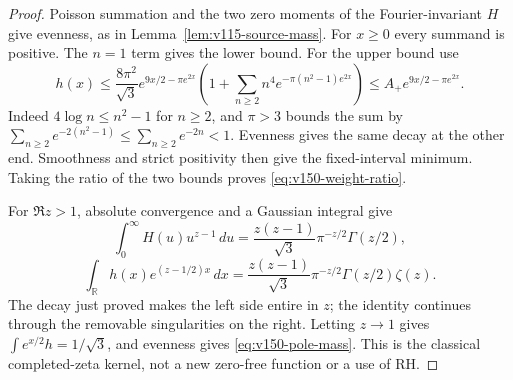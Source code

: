 \documentclass[11pt]{article}
\theoremstyle{remark}
\begin{document}
\begin{proof}
Poisson summation and the two zero moments of the Fourier-invariant
$H$ give evenness, as in Lemma~\ref{lem:v115-source-mass}.
For $x\ge0$ every summand is positive. The $n=1$ term gives the lower
bound. For the upper bound use
\[
 h(x)\le\frac{8\pi^2}{\sqrt3}e^{9x/2-\pi e^{2x}}
 \left(1+\sum_{n\ge2}n^4e^{-\pi(n^2-1)e^{2x}}\right)
 \le A_+e^{9x/2-\pi e^{2x}}.
\]
Indeed $4\log n\le n^2-1$ for $n\ge2$, and $\pi>3$ bounds the sum
by $\sum_{n\ge2}e^{-2(n^2-1)}\le\sum_{n\ge2}e^{-2n}<1$.
Evenness gives the same decay at the other end. Smoothness and strict
positivity then give the fixed-interval minimum. Taking the ratio of
the two bounds proves \eqref{eq:v150-weight-ratio}.

For $\Re z>1$, absolute convergence and a Gaussian integral give
\[
 \int_0^\infty H(u)u^{z-1}\,du
 =\frac{z(z-1)}{\sqrt3}\pi^{-z/2}\Gamma(z/2),
\]
\begin{equation}\label{eq:v150-mellin}
 \int_{\mathbb R}h(x)e^{(z-1/2)x}\,dx
 =\frac{z(z-1)}{\sqrt3}\pi^{-z/2}\Gamma(z/2)\zeta(z).
\end{equation}
The decay just proved makes the left side entire in $z$; the identity
continues through the removable singularities on the right. Letting
$z\to1$ gives $\int e^{x/2}h=1/\sqrt3$, and evenness gives
\eqref{eq:v150-pole-mass}. This is the classical completed-zeta kernel,
not a new zero-free function or a use of RH.
\end{proof}
\end{document}
